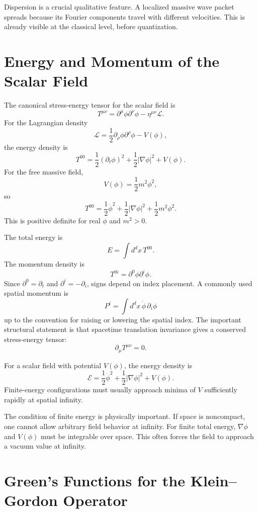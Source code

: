 Dispersion is a crucial qualitative feature. A localized massive wave packet
spreads because its Fourier components travel with different velocities. This
is already visible at the classical level, before quantization.

\section{Energy and Momentum of the Scalar Field}

The canonical stress-energy tensor for the scalar field is
\[
    T^{\mu\nu}=\partial^\mu\phi\partial^\nu\phi-\eta^{\mu\nu}\mathcal{L}.
\]
For the Lagrangian density
\[
    \mathcal{L}=\frac{1}{2}\partial_\rho\phi\partial^\rho\phi-V(\phi),
\]
the energy density is
\[
    T^{00}
    =\frac{1}{2}(\partial_t\phi)^2
     +\frac{1}{2}|\nabla\phi|^2
     +V(\phi).
\]
For the free massive field,
\[
    V(\phi)=\frac{1}{2}m^2\phi^2,
\]
so
\[
    T^{00}
    =\frac{1}{2}\dot\phi^2
     +\frac{1}{2}|\nabla\phi|^2
     +\frac{1}{2}m^2\phi^2.
\]
This is positive definite for real \(\phi\) and \(m^2>0\).

The total energy is
\[
    E=\int d^d x\,T^{00}.
\]
The momentum density is
\[
    T^{0i}=\partial^0\phi\partial^i\phi.
\]
Since \(\partial^0=\partial_t\) and \(\partial^i=-\partial_i\), signs depend on
index placement. A commonly used spatial momentum is
\[
    P^i=\int d^d x\,\dot\phi\,\partial_i\phi
\]
up to the convention for raising or lowering the spatial index. The important
structural statement is that spacetime translation invariance gives a conserved
stress-energy tensor:
\[
    \partial_\mu T^{\mu\nu}=0.
\]

\begin{definitionbox}
For a scalar field with potential \(V(\phi)\), the energy density is
\[
    \mathcal{E}=\frac{1}{2}\dot\phi^2+
    \frac{1}{2}|\nabla\phi|^2+V(\phi).
\]
Finite-energy configurations must usually approach minima of \(V\) sufficiently
rapidly at spatial infinity.
\end{definitionbox}

The condition of finite energy is physically important. If space is noncompact,
one cannot allow arbitrary field behavior at infinity. For finite total energy,
\(\nabla\phi\) and \(V(\phi)\) must be integrable over space. This often forces
the field to approach a vacuum value at infinity.

\section{Green's Functions for the Klein--Gordon Operator}

